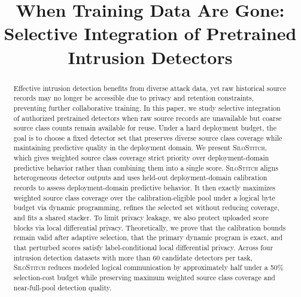 \documentclass[conference]{IEEEtran}
\theoremstyle{definition}
\newcommand{\Fname}{\textsc{SiloStitch}\xspace}
\begin{document}
\title{When Training Data Are Gone: Selective Integration of Pretrained Intrusion Detectors}

\author{}

\IEEEoverridecommandlockouts
\makeatletter{}\makeatother
{}

\maketitle

\begin{abstract}
Effective intrusion detection benefits from diverse attack data, yet raw historical source records may no longer be accessible due to privacy and retention constraints, preventing further collaborative training.
In this paper, we study selective integration of authorized pretrained detectors when raw source records are unavailable but coarse source class counts remain available for reuse.
Under a hard deployment budget, the goal is to choose a fixed detector set that preserves diverse source class coverage while maintaining predictive quality in the deployment domain.
We present \Fname, which gives weighted source class coverage strict priority over deployment-domain predictive behavior rather than combining them into a single score.
\Fname aligns heterogeneous detector outputs and uses held-out deployment-domain calibration records to assess deployment-domain predictive behavior.
It then exactly maximizes weighted source class coverage over the calibration-eligible pool under a logical byte budget via dynamic programming, refines the selected set without reducing coverage, and fits a shared stacker.
To limit privacy leakage, we also protect uploaded score blocks via local differential privacy.
Theoretically, we prove that the calibration bounds remain valid after adaptive selection, that the primary dynamic program is exact, and that perturbed scores satisfy label-conditional local differential privacy.
Across four intrusion detection datasets with more than 60 candidate detectors per task, \Fname reduces modeled logical communication by approximately half under a 50\% selection-cost budget while preserving maximum weighted source class coverage and near-full-pool detection quality.
\end{abstract}
\end{document}
